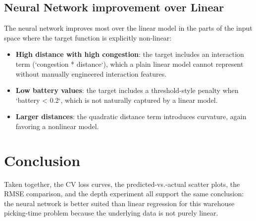 \documentclass[10pt,twocolumn]{article}
\begin{document}
\subsection{Neural Network improvement over Linear}

The neural network improves most over the linear model in the parts of the input space where the target function is explicitly non-linear:
\begin{itemize}
	\item \textbf{High distance with high congestion}: the target includes an interaction term (`congestion * distance`), which a plain linear model cannot represent without manually engineered interaction features.
	\item \textbf{Low battery values}: the target includes a threshold-style penalty when `battery < 0.2`, which is not naturally captured by a linear model.
	\item \textbf{Larger distances}: the quadratic distance term introduces curvature, again favoring a nonlinear model.
\end{itemize}

\section{Conclusion}
Taken together, the CV loss curves, the predicted-vs.-actual scatter plots, the RMSE comparison, and the depth experiment all support the same conclusion: the neural network is better suited than linear regression for this warehouse picking-time problem because the underlying data is not purely linear.


\nocite{*}




\end{document}
